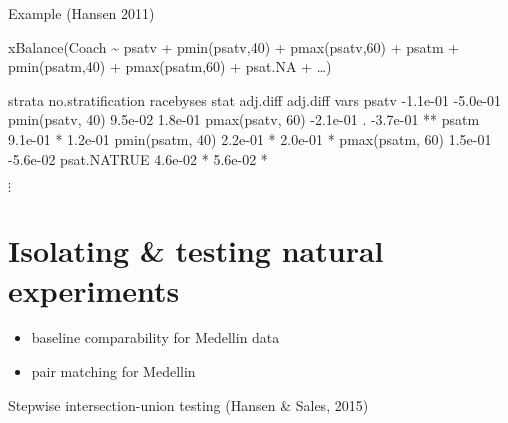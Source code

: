 \begin{frame}[fragile]{Example (Hansen 2011)}

{\small
\begin{semiverbatim}
xBalance(Coach \textasciitilde 
         psatv + pmin(psatv,40) + pmax(psatv,60) + 
         psatm + pmin(psatm,40) + pmax(psatm,60) + 
         psat.NA + \ldots) 

                    strata no.stratification          racebyses         
                     stat            adj.diff           adj.diff         
vars                                                                     
psatv                                -1.1e-01           -5.0e-01         
pmin(psatv, 40)                      9.5e-02            1.8e-01          
pmax(psatv, 60)                      -2.1e-01 .         -3.7e-01 **      
psatm                                9.1e-01  *         1.2e-01          
pmin(psatm, 40)                      2.2e-01  *         2.0e-01  *       
pmax(psatm, 60)                      1.5e-01            -5.6e-02         
psat.NATRUE                          4.6e-02  *         5.6e-02  *       
\end{semiverbatim}
$\vdots$    

}


  
\end{frame}

\section[Isolating natural experiments]{Isolating \& testing natural experiments}


\begin{frame}

  \begin{itemize}
  \item baseline comparability for Medellin data

\item pair matching for Medellin

  \end{itemize}
  
\end{frame}

\begin{frame}{Stepwise intersection-union testing (Hansen \& Sales, 2015)}
  
\end{frame}




